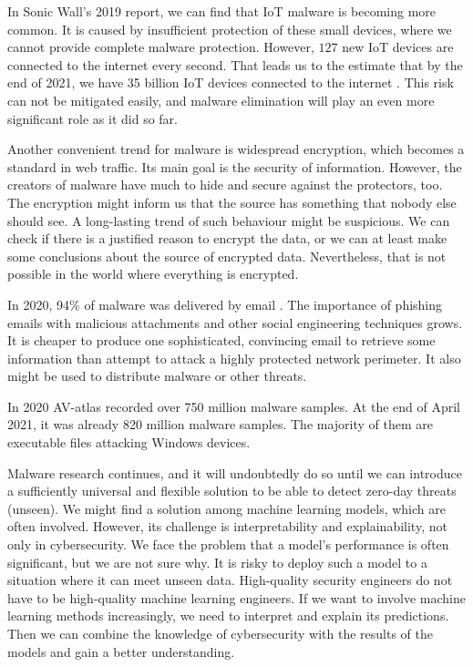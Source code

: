 In Sonic Wall's 2019 report, we can find that IoT malware is becoming more common. It is caused by insufficient protection of these small devices, where we cannot provide complete malware protection. However, $127$ new IoT devices are connected to the internet every second. That leads us to the estimate that by the end of 2021, we have 35 billion IoT devices connected to the internet \cite{TheIoTRu52:online}. This risk can not be mitigated easily, and malware elimination will play an even more significant role as it did so far.

Another convenient trend for malware is widespread encryption, which becomes a standard in web traffic. Its main goal is the security of information. However, the creators of malware have much to hide and secure against the protectors, too. The encryption might inform us that the source has something that nobody else should see. A long-lasting trend of such behaviour might be suspicious. We can check if there is a justified reason to encrypt the data, or we can at least make some conclusions about the source of encrypted data. Nevertheless, that is not possible in the world where everything is encrypted.

In 2020, 94\% of malware was delivered by email \cite{Topcyber13:online}. The importance of phishing emails with malicious attachments and other social engineering techniques grows. It is cheaper to produce one sophisticated, convincing email to retrieve some information than attempt to attack a highly protected network perimeter. It also might be used to distribute malware or other threats.

In 2020 AV-atlas \cite{AVATLASM39:online} recorded over 750 million malware samples. At the end of April 2021, it was already 820 million malware samples. The majority of them are executable files attacking Windows devices.

Malware research continues, and it will undoubtedly do so until we can introduce a sufficiently universal and flexible solution to be able to detect zero-day threats (unseen). We might find a solution among machine learning models, which are often involved. However, its challenge is interpretability and explainability, not only in cybersecurity. We face the problem that a model's performance is often significant, but we are not sure why. It is risky to deploy such a model to a situation where it can meet unseen data. High-quality security engineers do not have to be high-quality machine learning engineers. If we want to involve machine learning methods increasingly, we need to interpret and explain its predictions. Then we can combine the knowledge of cybersecurity with the results of the models and gain a better understanding. 


